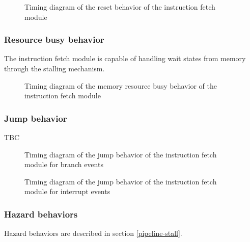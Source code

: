 \begin{figure}[H]
    \centering
    
    \caption{Timing diagram of the reset behavior of the instruction fetch module}
    \label{fig:ifm-behavior-reset}
\end{figure}

\subsubsection{Resource busy behavior}

\begin{content}
  The instruction fetch module is capable of handling wait states from memory through the stalling mechanism.
\end{content}

\begin{figure}[H]
    \centering
    
    \caption{Timing diagram of the memory resource busy behavior of the instruction fetch module}
    \label{fig:ifm-behavior-wait}
\end{figure}

\subsubsection{Jump behavior}

\begin{content}
  TBC
\end{content}

\begin{figure}[H]
    \centering
    
    \caption{Timing diagram of the jump behavior of the instruction fetch module for branch events}
    \label{fig:ifm-behavior-branch}
\end{figure}

\begin{figure}[H]
    \centering
    
    \caption{Timing diagram of the jump behavior of the instruction fetch module for interrupt events}
    \label{fig:ifm-behavior-interrupt}
\end{figure}

\subsubsection{Hazard behaviors}

\begin{content}
  Hazard behaviors are described in section \ref{pipeline-stall}.
\end{content}

\newpage
